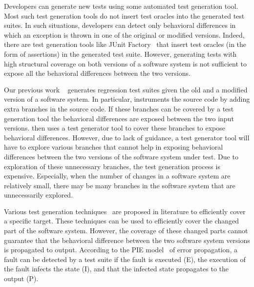 Developers can generate new tests using some automated test generation tool. Most such test generation tools do not
insert test oracles into the generated test suites. In such situations, developers can detect only behavioral differences in
which an exception is thrown in one of the original or modified versions. Indeed, there are test generation tools like
JUnit Factory~\cite{JUF} that insert test oracles (in the form of assertions) in the generated test suite. However, generating
tests with high structural coverage on both versions of a software system is not sufficient to expose all the behavioral
differences between the two versions.

Our previous work ~\cite{taneja08:diffgen} generates regression test suites given the old and a modified version of a software system. In particular,  instruments the source code by adding extra branches in the source code. If these branches can be covered by a test generation tool the behavioral differences are exposed between the two input versions.   then uses a test generator tool to cover these branches to expose behavioral differences. However, due to lack of guidance, a test generator tool will have to explore various branches that cannot help in exposing behavioral differences between the two versions of the software system under test. Due to exploration of these unnecessary branches, the test generation process is expensive. Especially, when the number of changes in a software system are relatively small, there may be many branches in the software system that are unnecessarily explored. 

Various test generation techniques~\cite{burnim, fitnex} are proposed in literature to efficiently cover a specific target. These techniques can be used to efficiently cover the changed part of the software system. However, the coverage of these changed parts cannot guarantee that the behavioral difference between the two software system versions is propagated to output. According to the PIE model~\cite{voas} of error propagation, a fault can be detected by a test suite if the fault is executed (E), the execution of the fault infects the state (I), and that the infected state propagates to the output (P). 

